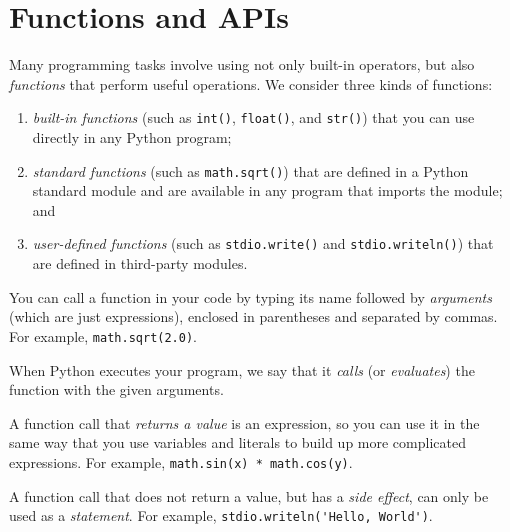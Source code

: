 \documentclass[8pt,a4paper,compress,handout]{beamer}
\begin{document}
\section{Functions and APIs}
\begin{frame}[fragile]
Many programming tasks involve using not only built-in operators, but also \emph{functions} that perform useful operations. We consider three kinds of functions: 
\begin{enumerate}
\item \emph{built-in functions} (such as \lstinline{int()}, \lstinline{float()}, and \lstinline{str()}) that you can use directly in any Python program; 

\item \emph{standard functions} (such as \lstinline{math.sqrt()}) that are defined in a Python standard module and are available in any program that imports the module; and 

\item \emph{user-defined functions} (such as \lstinline{stdio.write()} and \lstinline{stdio.writeln()}) that are defined in third-party modules.
\end{enumerate}

\bigskip

You can call a function in your code by typing its name followed by \emph{arguments} (which are just expressions), enclosed in parentheses and separated by commas. For example, \lstinline{math.sqrt(2.0)}.

\bigskip

When Python executes your program, we say that it \emph{calls} (or \emph{evaluates}) the function with the given arguments.

\bigskip

A function call that \emph{returns a value} is an expression, so you can use it in the same way that you use variables and literals to build up more complicated expressions. For example, \lstinline{math.sin(x) * math.cos(y)}. 

\bigskip

A function call that does not return a value, but has a \emph{side effect}, can only be used as a \emph{statement}. For example, \lstinline{stdio.writeln('Hello, World')}.
\end{frame}
\end{document}

